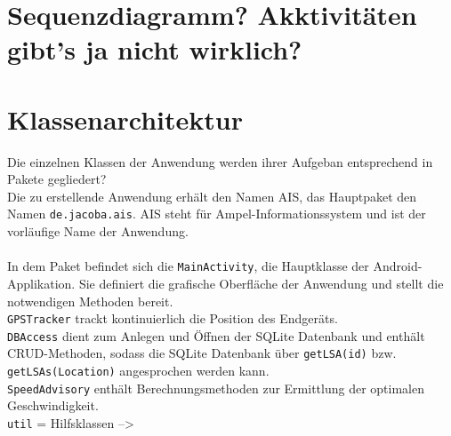 \section{Sequenzdiagramm? Akktivitäten gibt's ja nicht wirklich?}
\section{Klassenarchitektur}
Die einzelnen Klassen der Anwendung werden ihrer Aufgeban entsprechend in Pakete gegliedert?\\
Die zu erstellende Anwendung erhält den Namen AIS, das Hauptpaket den Namen \texttt{de.jacoba.ais}. AIS steht für Ampel-Informationssystem und ist der vorläufige Name der Anwendung. \\\\
In dem Paket befindet sich die \texttt{MainActivity}, die Hauptklasse der Android-Applikation. Sie definiert die grafische Oberfläche der Anwendung und stellt die notwendigen Methoden bereit. \\
\texttt{GPSTracker} trackt kontinuierlich die Position des Endgeräts.\\
\texttt{DBAccess} dient zum Anlegen und Öffnen der SQLite Datenbank und enthält CRUD-Methoden, sodass die SQLite Datenbank über \texttt{getLSA(id)} bzw. \texttt{getLSAs(Location)} angesprochen werden kann. \\
\texttt{SpeedAdvisory} enthält Berechnungsmethoden zur Ermittlung der optimalen Geschwindigkeit.\\
 \texttt{util} = Hilfsklassen -->
